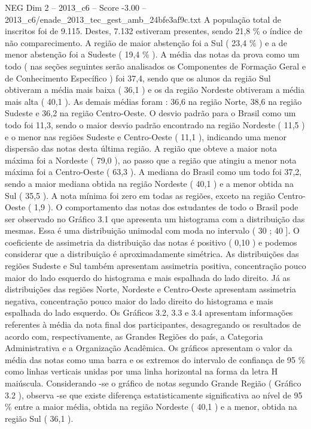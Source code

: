 \begin{textsample}{NEG Dim 2 – 2013\_c6 – Score -3.00 – 2013\_c6/enade\_2013\_tec\_gest\_amb\_24bfe3af9c.txt}
A população total de inscritos foi de 9.115.
Destes, 7.132 estiveram presentes, sendo 21,8 \% o índice de não comparecimento.
A região de maior abstenção foi a Sul ( 23,4 \% ) e a de menor abstenção foi a Sudeste ( 19,4 \% ).
A média das notas da prova como um todo ( nas seções seguintes serão analisados os Componentes de Formação Geral e de Conhecimento Específico ) foi 37,4, sendo que os alunos da região Sul obtiveram a média mais baixa ( 36,1 ) e os da região Nordeste obtiveram a média mais alta ( 40,1 ).
As demais médias foram : 36,6 na região Norte, 38,6 na região Sudeste e 36,2 na região Centro-Oeste.
O desvio padrão para o Brasil como um todo foi 11,3, sendo o maior desvio padrão encontrado na região Nordeste ( 11,5 ) e o menor nas regiões Sudeste e Centro-Oeste ( 11,1 ), indicando uma menor dispersão das notas desta última região.
A região que obteve a maior nota máxima foi a Nordeste ( 79,0 ), ao passo que a região que atingiu a menor nota máxima foi a Centro-Oeste ( 63,3 ).
A mediana do Brasil como um todo foi 37,2, sendo a maior mediana obtida na região Nordeste ( 40,1 ) e a menor obtida na Sul ( 35,5 ).
A nota mínima foi zero em todas as regiões, exceto na região Centro-Oeste ( 1,9 ).
O comportamento das notas dos estudantes de todo o Brasil pode ser observado no Gráfico 3.1 que apresenta um histograma com a distribuição das mesmas.
Essa é uma distribuição unimodal com moda no intervalo ( 30 ; 40 ].
O coeficiente de assimetria da distribuição das notas é positivo ( 0,10 ) e podemos considerar que a distribuição é aproximadamente simétrica.
As distribuições das regiões Sudeste e Sul também apresentam assimetria positiva, concentração pouco maior do lado esquerdo do histograma e mais espalhada do lado direito.
Já as distribuições das regiões Norte, Nordeste e Centro-Oeste apresentam assimetria negativa, concentração pouco maior do lado direito do histograma e mais espalhada do lado esquerdo.
Os Gráficos 3.2, 3.3 e 3.4 apresentam informações referentes à média da nota final dos participantes, desagregando os resultados de acordo com, respectivamente, as Grandes Regiões do país, a Categoria Administrativa e a Organização Acadêmica.
Os gráficos apresentam o valor da média das notas como uma barra e os extremos do intervalo de confiança de 95 \% como linhas verticais unidas por uma linha horizontal na forma da letra H maiúscula.
Considerando -se o gráfico de notas segundo Grande Região ( Gráfico 3.2 ), observa -se que existe diferença estatisticamente significativa ao nível de 95 \% entre a maior média, obtida na região Nordeste ( 40,1 ) e a menor, obtida na região Sul ( 36,1 ).

\end{textsample}

